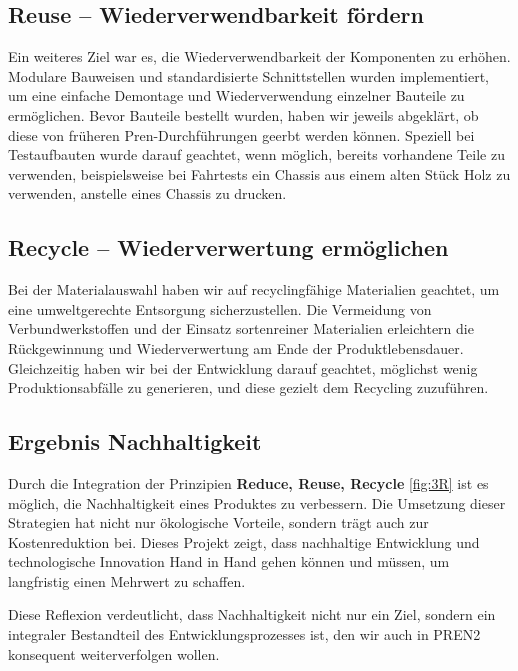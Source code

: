 \documentclass[../main.tex]{subfiles}
\begin{document}
\subsection{Reuse – Wiederverwendbarkeit fördern}

Ein weiteres Ziel war es, die Wiederverwendbarkeit der Komponenten zu erhöhen. Modulare Bauweisen und standardisierte Schnittstellen wurden implementiert, um eine einfache Demontage und Wiederverwendung einzelner Bauteile zu ermöglichen. Bevor Bauteile bestellt wurden, haben wir jeweils abgeklärt, ob diese von früheren Pren-Durchführungen geerbt werden können. Speziell bei Testaufbauten wurde darauf geachtet, wenn möglich, bereits vorhandene Teile zu verwenden, beispielsweise bei Fahrtests ein Chassis aus einem alten Stück Holz zu verwenden, anstelle eines Chassis zu drucken.

\subsection{Recycle – Wiederverwertung ermöglichen}

Bei der Materialauswahl haben wir auf recyclingfähige Materialien geachtet, um eine umweltgerechte Entsorgung sicherzustellen. Die Vermeidung von Verbundwerkstoffen und der Einsatz sortenreiner Materialien erleichtern die Rückgewinnung und Wiederverwertung am Ende der Produktlebensdauer. Gleichzeitig haben wir bei der Entwicklung darauf geachtet, möglichst wenig Produktionsabfälle zu generieren, und diese gezielt dem Recycling zuzuführen.

\subsection{Ergebnis Nachhaltigkeit}

Durch die Integration der Prinzipien \textbf{Reduce, Reuse, Recycle} \ref{fig:3R} ist es möglich, die Nachhaltigkeit eines Produktes zu verbessern. Die Umsetzung dieser Strategien hat nicht nur ökologische Vorteile, sondern trägt auch zur Kostenreduktion bei. Dieses Projekt zeigt, dass nachhaltige Entwicklung und technologische Innovation Hand in Hand gehen können und müssen, um langfristig einen Mehrwert zu schaffen.

Diese Reflexion verdeutlicht, dass Nachhaltigkeit nicht nur ein Ziel, sondern ein integraler Bestandteil des Entwicklungsprozesses ist, den wir auch in PREN2 konsequent weiterverfolgen wollen.
\end{document}
